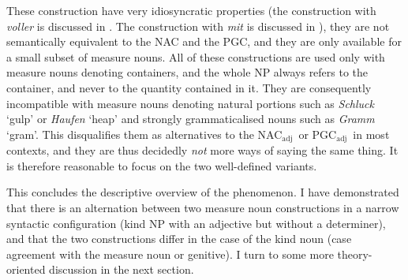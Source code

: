 \documentclass[USenglish]{article}
\newcommand{\Sub}[1]{\ensuremath{\mathrm{_{#1}}}}
\newcommand{\NACa}{NAC\Sub{adj}}
\newcommand{\PGCa}{PGC\Sub{adj}}
\begin{document}
\begin{exe}
  \ex\label{ex:alternatives}
  \begin{xlist}
  \end{xlist}
\end{exe}

These construction have very idiosyncratic properties (the construction with \textit{voller} is discussed in \citealp{Zeldes2018}.
The construction with \textit{mit} is discussed in \citealp{Bhatt1990}), they are not semantically equivalent to the NAC and the PGC, and they are only available for a small subset of measure nouns.
All of these constructions are used only with measure nouns denoting containers, and the whole NP always refers to the container, and never to the quantity contained in it.
They are consequently incompatible with measure nouns denoting natural portions such as \textit{Schluck} `gulp' or \textit{Haufen} `heap' and strongly grammaticalised nouns such as \textit{Gramm} `gram'.
This disqualifies them as alternatives to the \NACa\ or \PGCa\ in most contexts, and they are thus decidedly \textit{not} more ways of saying the same thing. 
It is therefore reasonable to focus on the two well-defined variants.

This concludes the descriptive overview of the phenomenon.
I have demonstrated that there is an alternation between two measure noun constructions in a narrow syntactic configuration (kind NP with an adjective but without a determiner), and that the two constructions differ in the case of the kind noun (case agreement with the measure noun or genitive).
I turn to some more theory-oriented discussion in the next section.


\end{document}

